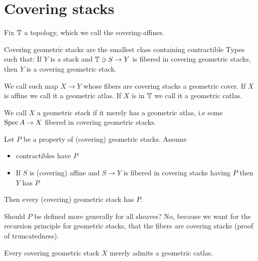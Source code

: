 
\section{Covering stacks}
Fix $\mathbb{T}$ a topology, which we call the covering-affines.
\begin{definition}
	Covering geometric stacks are the smallest class containing contractible Types such that: If $Y$ is a stack and $\mathbb{T} \ni S \to Y$ is fibered in covering geometric stacks, then $Y$ is a covering geometric stack.	
\end{definition}
We call such map $X \to Y$ whose fibers are covering stacks a geometric cover. If $X$ is affine we call it a geometric atlas. If $X$ is in $\mathbb{T}$ we call it a geometric catlas. 
\begin{definition}
	We call $X$ a geometric stack if it merely has a geometric atlas, i.e some $\operatorname{Spec} A \to X$ fibered in covering geometric stacks.
\end{definition}
\begin{prop}
	Let $P$ be a property of (covering) geometric stacks. Assume
	\begin{itemize}
		\item contractibles have $P$
		\item If $S$ is (covering) affine and $S \to Y$ is fibered in covering stacks having $P$ then $Y$ has $P$
	\end{itemize}
	Then every (covering) geometric stack has $P$.
\end{prop}
%	
\begin{why}
	Should $P$ be defined more generally for all sheaves?
	No, because we want for the recursion principle for geometric stacks, that the fibers are covering stacks (proof of truncatedness).
\end{why}
\begin{prop}{\label{prop:csHasAtlas}}
Every covering geometric stack $X$ merely admits a geometric catlas. %
\end{prop}

